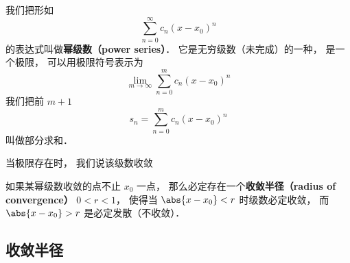 
\begin{issues}
\issueDraft
\end{issues}


我们把形如
\begin{equation}
\sum_{n=0}^\infty c_n (x-x_0)^n
\end{equation}
的表达式叫做\textbf{幂级数（power series）}． 它是无穷级数（未完成）的一种， 是一个极限， 可以用极限符号表示为
\begin{equation}
\lim_{m\to\infty} \sum_{n=0}^m c_n (x-x_0)^n
\end{equation}
我们把前 $m+1$ 
\begin{equation}
s_n = \sum_{n=0}^m c_n (x-x_0)^n
\end{equation}
叫做部分求和．

当极限存在时， 我们说该级数收敛

如果某幂级数收敛的点不止 $x_0$ 一点， 那么必定存在一个\textbf{收敛半径（radius of convergence）} $0 < r < 1$， 使得当 $\abs{x-x_0} < r$ 时级数必定收敛， 而 $\abs{x-x_0} > r$ 是必定发散（不收敛）．

\subsection{收敛半径}